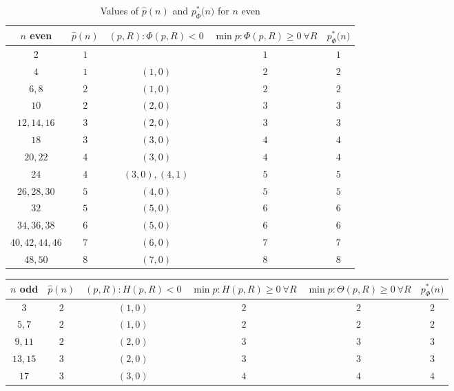 \documentclass[11pt,a4paper,times]{amsart}
\theoremstyle{plain}
\theoremstyle{definition}
\numberwithin{equation}{section}
\newcommand{\piphi}[1]{p^*_{\Phi}{#1}}
\begin{document}
{%
{\footnotesize 
\begin{table}[h!]
\centering
\begin{tabular}{|c|c|c|c|c|}
\hline
\scriptsize{$n$ even} &\scriptsize{$\hat{p}(n)$}&
\scriptsize{$(p,R):\Phi(p,R)<0$} &\scriptsize{$\min p:\Phi(p,R)\geq 0 ~\forall R$} & \scriptsize{$\piphi(n)$}\\ 
\hline
 $2$ & $1$  &  {}   & $1$ & $1$\\
\hline
 $4$ & $1$ & $(1,0)$ & $2$  & $2$\\
 \hline
 $6,8$ & $2$ & $(1,0)$ & $2$  & $2$\\
  \hline
  $10$ & $2$ & $(2,0)$ & $3$  & $3$\\
   \hline
   $12,14,16$ &3& $(2,0)$ & $3$ & $3$\\ 
    \hline
   $18$ & $3$ & $(3,0)$ & $4$  & $4$\\  
    \hline
  $20,22$ &4& $(3,0)$ & $4$ & $4$\\
   \hline
 $24$ & $4$ & $(3,0),(4,1)$ & $5$ & $5$\\
  \hline
 $26,28,30$ & $5$ & $(4,0)$ & $5$ & $5$\\
  \hline
 $32$ & $5$ & $(5,0)$ & $6$  & $6$\\
  \hline
  $34,36,38$ & $6$ &  $(5,0)$ & $6$  & $6$\\
   \hline
   $40,42,44,46$ &$7$&  $(6,0)$ & $7$  & $7$\\
    \hline
    $48,50$ & $8$ & $(7,0)$ & $8$ & $8$\\
 \hline
 \end{tabular}
 \vspace*{3mm}
 \caption{Values of $\hat{p}(n)$ and $\piphi(n)$ for $n$ even}\label{evenp}
 \end{table}}
{\footnotesize 
\begin{table}[h!]
\centering
\begin{tabular}{|c|c|c|c|c|c|}
\hline
\scriptsize{$n$ odd}&\scriptsize{$\hat{p}(n)$}&\scriptsize{$(p,R):H(p,R)<0$} &\scriptsize{$\min   p:H(p,R)\geq 0 ~\forall R$}& \scriptsize{$\min p:\Theta(p,R)\geq 0 ~\forall R$} & 
\scriptsize{$\piphi(n)$}\\ 
\hline
 $3$ & $2$  & $(1,0)$   & $2$ & $2$ & $2$\\
\hline
 $5,7$ & $2$  & $(1,0)$   & $2$ & $2$ & $2$\\
 \hline
  $9,11$ & $2$  & $(2,0)$   & $3$ & $3$ & $3$\\
 \hline
   $13,15$ & $3$  & $(2,0)$   & $3$ & $3$ & $3$\\
 \hline
  $17$ & $3$  & $(3,0)$   & $4$ & $4$ & $4$\\

\end{tabular}
\end{table}}}
\end{document}
